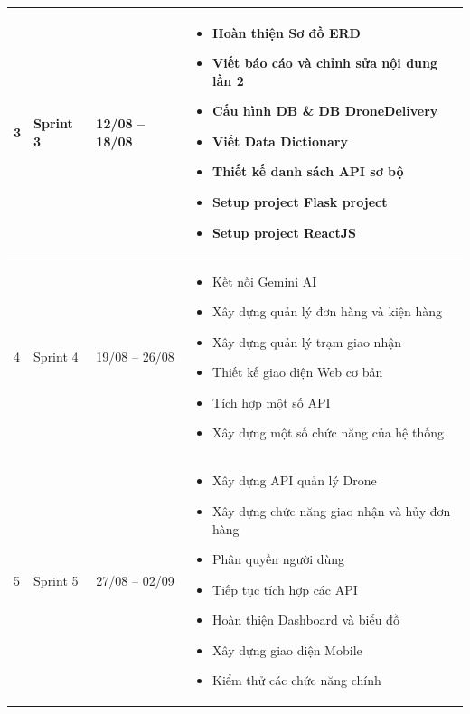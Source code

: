 \begin{longtable}{|C{0.08\textwidth}|C{0.16\textwidth}|C{0.20\textwidth}|C{0.50\textwidth}|}
3 &
Sprint 3 &
12/08 -- 18/08 &
\begin{itemize}
    \item Hoàn thiện Sơ đồ ERD
    \item Viết báo cáo và chỉnh sửa nội dung lần 2
    \item Cấu hình DB \& DB DroneDelivery
    \item Viết Data Dictionary
    \item Thiết kế danh sách API sơ bộ
    \item Setup project Flask project
    \item Setup project ReactJS
\end{itemize}
\\
\hline

4 &
Sprint 4 &
19/08 -- 26/08 &
\begin{itemize}
    \item Kết nối Gemini AI
    \item Xây dựng quản lý đơn hàng và kiện hàng
    \item Xây dựng quản lý trạm giao nhận
    \item Thiết kế giao diện Web cơ bản
    \item Tích hợp một số API
    \item Xây dựng một số chức năng của hệ thống
\end{itemize}
\\
\hline

5 &
Sprint 5 &
27/08 -- 02/09 &
\begin{itemize}
    \item Xây dựng API quản lý Drone
    \item Xây dựng chức năng giao nhận và hủy đơn hàng
    \item Phân quyền người dùng
    \item Tiếp tục tích hợp các API
    \item Hoàn thiện Dashboard và biểu đồ
    \item Xây dựng giao diện Mobile
    \item Kiểm thử các chức năng chính
\end{itemize}
\\
\hline

\end{longtable}


